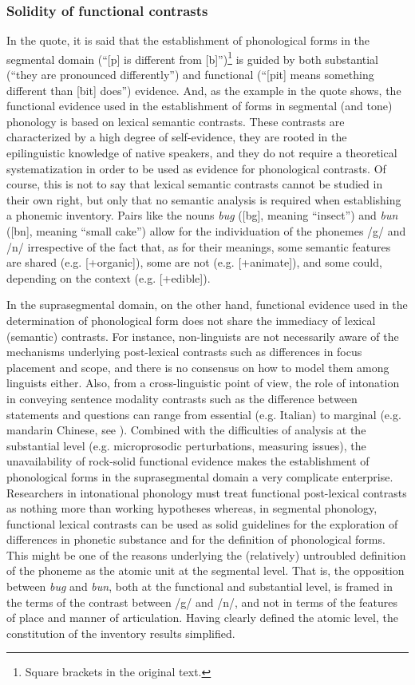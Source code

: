 \subsubsection{Solidity of functional contrasts}\label{sec2431}
In the quote, it is said that the establishment of phonological forms in the segmental domain (``[p] is different from [b]'')\footnote{Square brackets in the original text.} is guided by both substantial (``they are pronounced differently'') and functional (``[pit] means something different than [bit] does'') evidence. And, as the example in the quote shows, the functional evidence used in the establishment of forms in segmental (and tone) phonology is based on lexical semantic contrasts. These contrasts are characterized by a high degree of self-evidence, they are rooted in the epilinguistic knowledge of native speakers, and they do not require a theoretical systematization in order to be used as evidence for phonological contrasts. Of course, this is not to say that lexical semantic contrasts cannot be studied in their own right, but only that no semantic analysis is required when establishing a phonemic inventory. Pairs like the nouns \textit{bug} ([bg], meaning ``insect'') and \textit{bun} ([bn], meaning ``small cake'') allow for the individuation of the phonemes /g/ and /n/ irrespective of the fact that, as for their meanings, some semantic features are shared (e.g. [+organic]), some are not (e.g. [+animate]), and some could, depending on the context (e.g. [+edible]). 

In the suprasegmental domain, on the other hand, functional evidence used in the determination of phonological form does not share the immediacy of lexical (semantic) contrasts. For instance, non-linguists are not necessarily aware of the mechanisms underlying post-lexical contrasts such as differences in focus placement and scope, and there is no consensus on how to model them among linguists either. Also, from a cross-linguistic point of view, the role of intonation in conveying sentence modality contrasts such as the difference between statements and questions can range from essential (e.g. Italian) to marginal (e.g. mandarin Chinese, see \citealt{zeng2004tones}). Combined with the difficulties of analysis at the substantial level (e.g. microprosodic perturbations, measuring issues), the unavailability of rock-solid functional evidence makes the establishment of phonological forms in the suprasegmental domain a very complicate enterprise. Researchers in intonational phonology must treat functional post-lexical contrasts as nothing more than working hypotheses whereas, in segmental phonology, functional lexical contrasts can be used as solid guidelines for the exploration of differences in phonetic substance and for the definition of phonological forms. This might be one of the reasons underlying the (relatively) untroubled definition of the phoneme as the atomic unit at the segmental level. That is, the opposition between \textit{bug} and \textit{bun}, both at the functional and substantial level, is framed in the terms of the contrast between /g/ and /n/, and not in terms of the features of place and manner of articulation. Having clearly defined the atomic level, the constitution of the inventory results simplified. 

